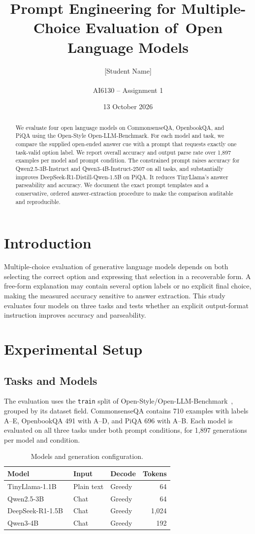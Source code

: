 \documentclass[10pt,twocolumn]{article}
\title{Prompt Engineering for Multiple-Choice Evaluation of\ Open Language Models}
\author{[Student Name]\\[Student ID]\\AI6130 -- Assignment 1}
\date{13 October 2026}
\begin{document}
\maketitle

\begin{abstract}
We evaluate four open language models on CommonsenseQA, OpenbookQA, and PiQA using the Open-Style Open-LLM-Benchmark. For each model and task, we compare the supplied open-ended answer cue with a prompt that requests exactly one task-valid option label. We report overall accuracy and output parse rate over 1,897 examples per model and prompt condition. The constrained prompt raises accuracy for Qwen2.5-3B-Instruct and Qwen3-4B-Instruct-2507 on all tasks, and substantially improves DeepSeek-R1-Distill-Qwen-1.5B on PiQA. It reduces TinyLlama's answer parseability and accuracy. We document the exact prompt templates and a conservative, ordered answer-extraction procedure to make the comparison auditable and reproducible.
\end{abstract}

\section{Introduction}
Multiple-choice evaluation of generative language models depends on both selecting the correct option and expressing that selection in a recoverable form. A free-form explanation may contain several option labels or no explicit final choice, making the measured accuracy sensitive to answer extraction. This study evaluates four models on three tasks and tests whether an explicit output-format instruction improves accuracy and parseability.

\section{Experimental Setup}
\subsection{Tasks and Models}
The evaluation uses the \texttt{train} split of Open-Style/Open-LLM-Benchmark~\cite{dataset}, grouped by its dataset field. CommonsenseQA contains 710 examples with labels A--E, OpenbookQA 491 with A--D, and PiQA 696 with A--B. Each model is evaluated on all three tasks under both prompt conditions, for 1,897 generations per model and condition.

\begin{table}[t]
\centering
\small
\caption{Models and generation configuration.}
\label{tab:models}
\begin{tabular}{@{}lll r@{}}
\toprule
Model & Input & Decode & Tokens\\
\midrule
TinyLlama-1.1B~\cite{tiny} & Plain text & Greedy & 64\\
Qwen2.5-3B~\cite{qwen25} & Chat & Greedy & 64\\
DeepSeek-R1-1.5B~\cite{deepseek} & Chat & Greedy & 1,024\\
Qwen3-4B~\cite{qwen3} & Chat & Greedy & 192\\
\bottomrule
\end{tabular}
\end{table}
\end{document}
